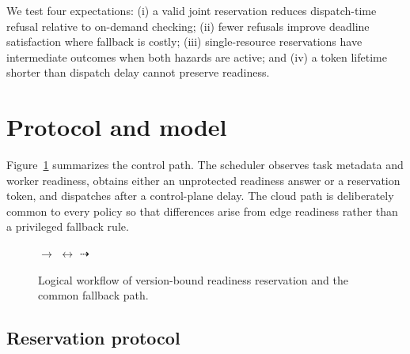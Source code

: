 \documentclass[conference]{IEEEtran}
\begin{document}
We test four expectations: (i) a valid joint reservation reduces dispatch-time refusal relative to on-demand checking; (ii) fewer refusals improve deadline satisfaction where fallback is costly; (iii) single-resource reservations have intermediate outcomes when both hazards are active; and (iv) a token lifetime shorter than dispatch delay cannot preserve readiness.

\section{Protocol and model}

Figure~\ref{fig:architecture} summarizes the control path. The scheduler observes
task metadata and worker readiness, obtains either an unprotected readiness answer
or a reservation token, and dispatches after a control-plane delay. The cloud path
is deliberately common to every policy so that differences arise from edge
readiness rather than a privileged fallback rule.

\begin{figure}[t]
\centering
\setlength{\fboxsep}{6pt}
\hspace{3pt}$\longrightarrow$
\hspace{3pt}$\longleftrightarrow$
\hspace{3pt}$\dashrightarrow$
\\[5pt]
\caption{Logical workflow of version-bound readiness reservation and the common fallback path.}
\label{fig:architecture}
\end{figure}

\subsection{Reservation protocol}
\end{document}
